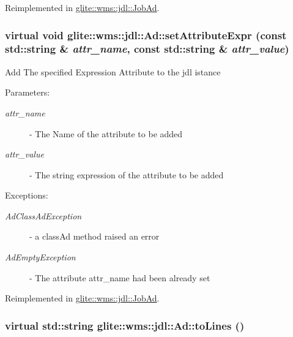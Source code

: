 Reimplemented in \hyperlink{classglite_1_1wms_1_1jdl_1_1JobAd_z5_5}{glite::wms::jdl::Job\-Ad}.\hypertarget{classglite_1_1wms_1_1jdl_1_1Ad_z19_8}{
\subsubsection[setAttributeExpr]{\setlength{\rightskip}{0pt plus 5cm}virtual void glite::wms::jdl::Ad::set\-Attribute\-Expr (const std::string \& {\em attr\_\-name}, const std::string \& {\em attr\_\-value})}}
\label{classglite_1_1wms_1_1jdl_1_1Ad_z19_8}


Add The specified Expression Attribute to the jdl istance \begin{Desc}
\item[Parameters:]
\begin{description}
\item[{\em attr\_\-name}]- The Name of the attribute to be added \item[{\em attr\_\-value}]- The string expression of the attribute to be added \end{description}
\end{Desc}
\begin{Desc}
\item[Exceptions:]
\begin{description}
\item[{\em Ad\-Class\-Ad\-Exception}]- a class\-Ad method raised an error \item[{\em Ad\-Empty\-Exception}]- The attribute attr\_\-name had been already set \end{description}
\end{Desc}


Reimplemented in \hyperlink{classglite_1_1wms_1_1jdl_1_1JobAd_z5_4}{glite::wms::jdl::Job\-Ad}.\hypertarget{classglite_1_1wms_1_1jdl_1_1Ad_z15_2}{
\subsubsection[toLines]{\setlength{\rightskip}{0pt plus 5cm}virtual std::string glite::wms::jdl::Ad::to\-Lines ()}}
\label{classglite_1_1wms_1_1jdl_1_1Ad_z15_2}


